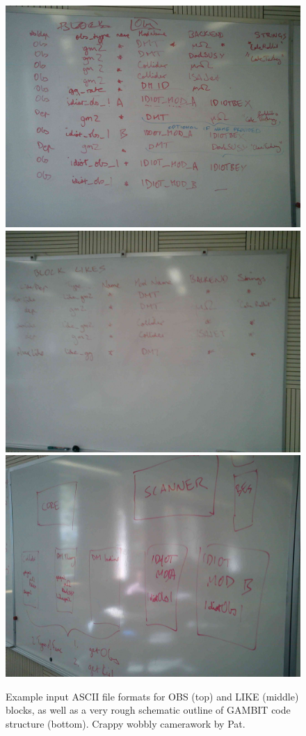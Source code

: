 \begin{figure}[tbp]
\includegraphics[width = 0.8\linewidth]{Code_Policies/fig1}\\
\includegraphics[width = 0.8\linewidth]{Code_Policies/fig2}\\
\includegraphics[width = 0.8\linewidth]{Code_Policies/fig3}
\caption{Example input ASCII file formats for OBS (top) and LIKE (middle) blocks, as well as a very rough schematic outline of GAMBIT code structure (bottom).  Crappy wobbly camerawork by Pat.}
\label{figure1}
\end{figure}

